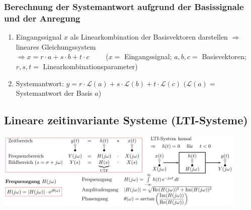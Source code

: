 		\subsubsection{Berechnung der Systemantwort aufgrund der Basissignale und der Anregung}
			\begin{enumerate}
				\item Eingangssignal $x$ als Linearkombination der Basisvektoren darstellen	$\Rightarrow$ lineares Gleichungssystem\\
				\quad $\Rightarrow x=r\cdot a + s\cdot b + t\cdot c\qquad$ ($x=$ Eingangssignal; $a,b,c=$ Basisvektoren; $r,s,t=$ Linearkombinationsparameter)\\ 
				\item Systemantwort: \quad $y=r\cdot \mathcal{L}(a) + s\cdot \mathcal{L}(b) + t\cdot \mathcal{L}(c)$ \qquad\quad $(\mathcal{L}(a)=$ Systemantwort der Basis $a$)
			\end{enumerate}


	
	\subsection{Lineare zeitinvariante Systeme (LTI-Systeme) }
		\includegraphics[width=0.9\textwidth]{./bilder/LTIAntwort.png} \\
	
	
  

